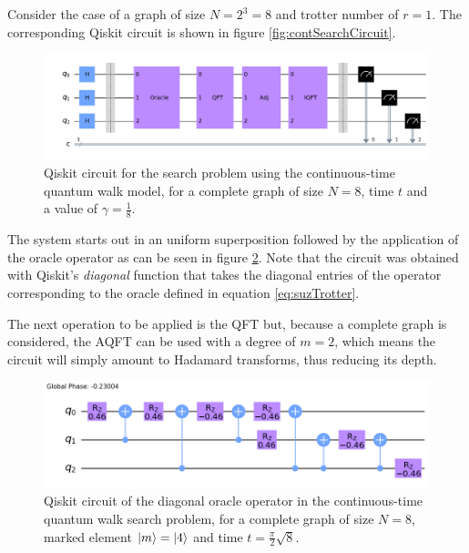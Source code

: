 \documentclass[../../dissertation.tex]{subfiles}
\begin{document}
Consider the case of a graph of size $N=2^3=8$ and trotter number of $r=1$. The
corresponding Qiskit circuit is shown in figure \ref{fig:contSearchCircuit}.
\begin{figure}[!h]
	\centering
	\includegraphics[scale=0.30]{img/Qiskit/ContQuantumWalk/Search/Circuits/circContSearch_N3_S2.png}
	\caption{Qiskit circuit for the search problem using the continuous-time quantum walk model, for a complete graph of size $N=8$, time $t$ and a value of $\gamma = \frac{1}{8}$.}
	\label{fig:contSearchCircQistkit}
\end{figure}
The system starts out in an uniform superposition followed by the application
of the oracle operator as can be seen in figure
\ref{fig:contSearchOracleCircQistkit}. Note that the circuit was obtained with
Qiskit's \textit{diagonal} function that takes the diagonal entries of the
operator corresponding to the oracle defined in equation
\eqref{eq:suzTrotter}.\par

The next operation to be applied is the QFT but, because a complete graph is
considered, the AQFT can be used with a degree of $m=2$, which means the
circuit will simply amount to Hadamard transforms, thus reducing its depth.
\begin{figure}[!h]
	\centering
	\includegraphics[scale=0.30]{img/Qiskit/ContQuantumWalk/Search/Circuits/circOracle_N3_S2.png}
	\caption{Qiskit circuit of the  diagonal oracle operator in the continuous-time quantum walk search problem, for a complete graph of size $N=8$, marked element $\ket{m}=\ket{4}$ and time $t=\frac{\pi}{2} \sqrt{8}$.}
	\label{fig:contSearchOracleCircQistkit}
\end{figure}\par
\end{document}
